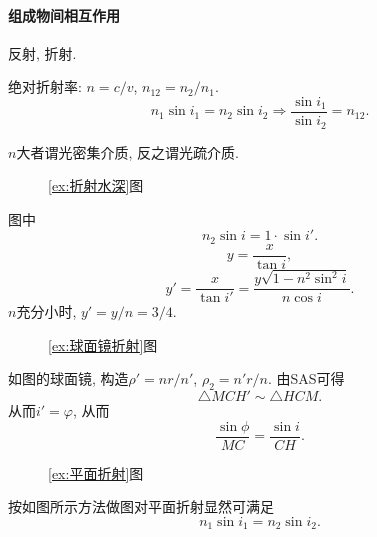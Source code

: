 \documentclass{ctexart}
\begin{document}

\paragraph{组成物间相互作用} %
\label{par:组成物间相互作用}

反射, 折射.


\begin{finale}
    \begin{lemma}[反射/折射定律]
        绝对折射率: $n = c/v$, $n_{12} = n_2/n_1$.
        \[ n_1 \sin i_1 = n_2\sin i_2 \Rightarrow \frac{\sin i_1}{\sin i_2} = n_{12}. \]
    \end{lemma}
\end{finale}
\begin{remark}
    $n$大者谓光密集介质, 反之谓光疏介质.
\end{remark}
\begin{figure}[ht]
    \centering
    \caption{\cref{ex:折射水深}图}
\end{figure}
\begin{sample}
    \begin{ex}
        \label{ex:折射水深}
        图中
        \[ n_2\sin i = 1\cdot \sin i'. \]
        \[ y = \frac{x}{\tan i}, \]
        \[ y' = \frac{x}{\tan i'} = \frac{y\sqrt{1-n^2\sin^2 i}}{n\cos i}. \]
        $n$充分小时, $y' = y/n = 3/4$.
    \end{ex}
\end{sample}
\begin{figure}[ht]
    \centering
    \caption{\cref{ex:球面镜折射}图}
\end{figure}
\begin{sample}
    \begin{ex}
        \label{ex:球面镜折射}
        如图的球面镜, 构造$\rho' = nr/n'$, $\rho_2 = n'r/n$. 由SAS可得
        \[ \bigtriangleup MCH' \sim \bigtriangleup HCM. \]
        从而$i' = \varphi$, 从而
        \[ \frac{\sin \phi}{MC} = \frac{\sin i}{CH}. \]
    \end{ex}
\end{sample}
\begin{figure}[ht]
    \centering
    \caption{\cref{ex:平面折射}图}
\end{figure}
\begin{sample}
    \begin{ex}
        \label{ex:平面折射}
        按如图所示方法做图对平面折射显然可满足
        \[ n_1\sin i_1 = n_2\sin i_2. \]
    \end{ex}
\end{sample}
\end{document}
